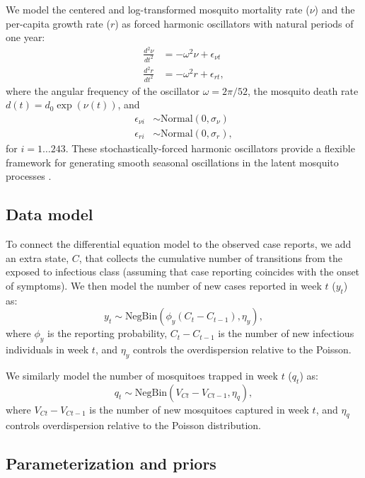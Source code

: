 \documentclass[10pt,letterpaper]{article}
\begin{document}
We model the centered and log-transformed mosquito mortality rate ($\nu$) and the per-capita growth rate ($r$) as forced harmonic oscillators with natural periods of one year:
\begin{align}
\frac{d^2\nu}{dt^2} &= -\omega^2 \nu + \epsilon_{\nu t}\\
\frac{d^2 r}{dt^2} &= -\omega^2 r + \epsilon_{rt},
\end{align}
where the angular frequency of the oscillator $\omega = 2\pi / 52$, the mosquito death rate $d(t) = d_0 \exp(\nu(t))$, and
\begin{align}
\epsilon_{\nu i} & \sim \text{Normal}(0, \sigma_{\nu})\\
\epsilon_{ri} & \sim \text{Normal}(0, \sigma_r),
\end{align}
for $i = 1 \dots 243$.
These stochastically-forced harmonic oscillators provide a flexible framework for generating smooth seasonal oscillations in the latent mosquito processes \cite{Ramsay2017}.

\subsection*{Data model}

To connect the differential equation model to the observed case reports, we add an extra state, $C$, that collects the cumulative number of transitions from the exposed to infectious class (assuming that case reporting coincides with the onset of symptoms).
We then model the number of new cases reported in week $t$ ($y_t$) as:
\begin{equation}
y_t  \sim \text{NegBin}(\phi_y (C_t - C_{t-1}), \eta_y),
\end{equation}
where $\phi_y$ is the reporting probability, $C_t - C_{t-1}$ is the number of new infectious individuals in week $t$, and $\eta_y$ controls the overdispersion relative to the Poisson.

We similarly model the number of mosquitoes trapped in week $t$ ($q_t$) as:
\begin{equation}
q_t \sim \text{NegBin}(V_{Ct} - V_{Ct-1}, \eta_q),
\end{equation}
where $V_{Ct} - V_{Ct-1}$ is the number of new mosquitoes captured in week $t$, and $\eta_q$ controls overdispersion relative to the Poisson distribution.

\subsection*{Parameterization and priors}
\end{document}
